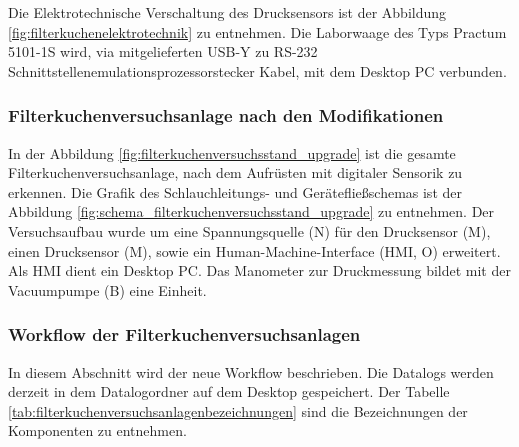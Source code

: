Die Elektrotechnische Verschaltung des Drucksensors ist der Abbildung \ref{fig:filterkuchenelektrotechnik} zu entnehmen. Die Laborwaage des Typs Practum 5101-1S wird, via mitgelieferten USB-Y zu RS-232 Schnittstellenemulationsprozessorstecker Kabel, mit dem Desktop PC verbunden. 

\subsubsection{Filterkuchenversuchsanlage nach den Modifikationen}

In der Abbildung \ref{fig:filterkuchenversuchsstand_upgrade} ist die gesamte Filterkuchenversuchsanlage, nach dem Aufrüsten mit digitaler Sensorik zu erkennen. Die Grafik des Schlauchleitungs- und Gerätefließschemas ist der Abbildung  \ref{fig:schema_filterkuchenversuchsstand_upgrade} zu entnehmen. Der Versuchsaufbau wurde um eine Spannungsquelle ({\Hypatia N}) für den Drucksensor ({\Hypatia M}), einen Drucksensor ({\Hypatia M}), sowie ein Human-Machine-Interface (HMI, {\Hypatia O}) erweitert. Als HMI dient ein Desktop PC. Das Manometer zur Druckmessung bildet mit der Vacuumpumpe ({\Hypatia B}) eine Einheit. 

\subsubsection{Workflow der Filterkuchenversuchsanlagen}

In diesem Abschnitt wird der neue Workflow beschrieben. Die Datalogs werden derzeit in dem Datalogordner auf dem Desktop gespeichert. Der Tabelle \ref{tab:filterkuchenversuchsanlagenbezeichnungen} sind die Bezeichnungen der Komponenten zu entnehmen.


